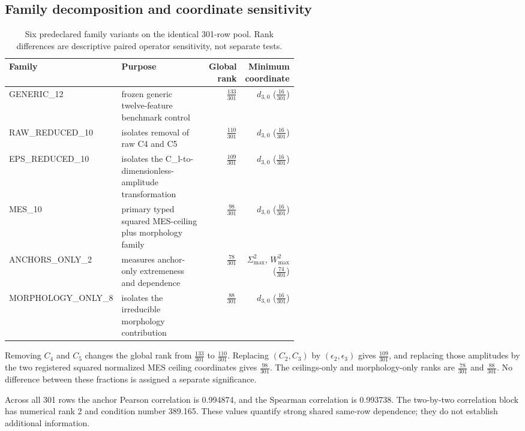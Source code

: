 \documentclass[11pt]{article}
\begin{document}
\subsection{Family decomposition and coordinate sensitivity}
\begin{table}[ht]
\centering
\small
\caption{Six predeclared family variants on the identical 301-row pool. Rank differences are descriptive paired operator sensitivity, not separate tests.}
\begin{tabular}{p{0.18\linewidth}p{0.38\linewidth}rr}
\toprule
Family & Purpose & Global rank & Minimum coordinate \\
\midrule
GENERIC\_12 & frozen generic twelve-feature benchmark control & $\frac{133}{301}$ & $d_{3,0}$ ($\frac{16}{301}$) \\
RAW\_REDUCED\_10 & isolates removal of raw C4 and C5 & $\frac{110}{301}$ & $d_{3,0}$ ($\frac{16}{301}$) \\
EPS\_REDUCED\_10 & isolates the C\_l-to-dimensionless-amplitude transformation & $\frac{109}{301}$ & $d_{3,0}$ ($\frac{16}{301}$) \\
MES\_10 & primary typed squared MES-ceiling plus morphology family & $\frac{98}{301}$ & $d_{3,0}$ ($\frac{16}{301}$) \\
ANCHORS\_ONLY\_2 & measures anchor-only extremeness and dependence & $\frac{78}{301}$ & $\Sigma^2_{\max}$, $W^2_{\max}$ ($\frac{74}{301}$) \\
MORPHOLOGY\_ONLY\_8 & isolates the irreducible morphology contribution & $\frac{88}{301}$ & $d_{3,0}$ ($\frac{16}{301}$) \\
\bottomrule
\end{tabular}
\label{tab:family-decomposition}
\end{table}

Removing $C_4$ and $C_5$ changes the global rank from $\frac{133}{301}$ to $\frac{110}{301}$. Replacing $(C_2,C_3)$ by $(\epsilon_2,\epsilon_3)$ gives $\frac{109}{301}$, and replacing those amplitudes by the two registered squared normalized MES ceiling coordinates gives $\frac{98}{301}$. The ceilings-only and morphology-only ranks are $\frac{78}{301}$ and $\frac{88}{301}$. No difference between these fractions is assigned a separate significance.

Across all 301 rows the anchor Pearson correlation is 0.994874, and the Spearman correlation is 0.993738. The two-by-two correlation block has numerical rank 2 and condition number 389.165. These values quantify strong shared same-row dependence; they do not establish additional information.
\end{document}
